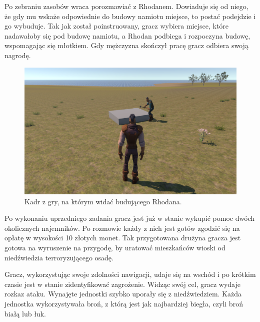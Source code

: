 Po zebraniu zasobów wraca porozmawiać z Rhodanem. Dowiaduje się od niego, że gdy mu wskaże odpowiednie do budowy namiotu
miejsce, to postać podejdzie i go wybuduje. Tak jak został poinstruowany, gracz wybiera miejsce, które nadawałoby się
pod budowę namiotu, a Rhodan podbiega i rozpoczyna budowę, wspomagając się młotkiem. Gdy mężczyzna skończył pracę gracz
odbiera swoją nagrodę.

\begin{figure}[h!]
    \centering
    \includegraphics[width=1\textwidth]{images/rozgrywka/rhodan9.png}
    \caption{Kadr z gry, na którym widać budującego Rhodana.}
\end{figure}
\FloatBarrier

Po wykonaniu uprzedniego zadania gracz jest już w stanie wykupić pomoc dwóch okolicznych
najemników. Po rozmowie każdy z nich jest gotów zgodzić się na opłatę w wysokości 10 złotych monet.
Tak przygotowana drużyna gracza jest gotowa na wyruszenie na przygodę, by uratować
mieszkańców wioski od niedźwiedzia terroryzującego osadę.

Gracz, wykorzystując swoje zdolności nawigacji, udaje się na wschód i po krótkim czasie jest w stanie zidentyfikować zagrożenie.
Widząc swój cel, gracz wydaje rozkaz ataku. Wynajęte jednostki szybko uporały się z niedźwiedziem. Każda jednostka wykorzystywała
broń, z którą jest jak najbardziej biegła, czyli broń białą lub łuk.

